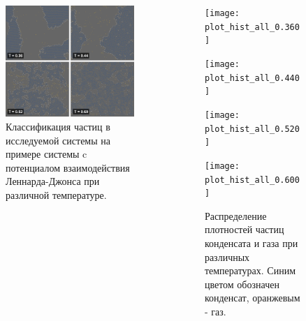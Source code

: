 \documentclass[pdf,hyperref={unicode}]{beamer}
\begin{document}
\begin{frame}
\transdissolve[duration=0.2]
\begin{columns}


\begin{column}{0.45\linewidth}

\begin{figure}[h]
\begin{center}
\includegraphics[width=\textwidth]{classification}
\caption{\tiny Классификация частиц в исследуемой системы на примере системы c потенциалом взаимодействия Леннарда-Джонса при различной температуре.}
\label{risClassExp}
\end{center}
\end{figure}

\end{column}

\begin{column}{0.55\linewidth}

\begin{figure}[h]
\begin{center}

\begin{minipage}[h]{0.47\linewidth}
\texttt{[image: plot\_hist\_all\_0.360]}
\end{minipage}
\begin{minipage}[h]{0.47\linewidth}
\texttt{[image: plot\_hist\_all\_0.440]}
\end{minipage}

\begin{minipage}[h]{0.47\linewidth}
\texttt{[image: plot\_hist\_all\_0.520]}
\end{minipage}
\begin{minipage}[h]{0.47\linewidth}
\texttt{[image: plot\_hist\_all\_0.600]}
\end{minipage}
\caption{\tiny Распределение плотностей частиц конденсата и газа при различных температурах. Синим цветом обозначен конденсат, оранжевым  - газ.}
\label{risRhoM}
\end{center}
\end{figure}


\end{column}
\end{columns}
\end{frame}
\end{document}
